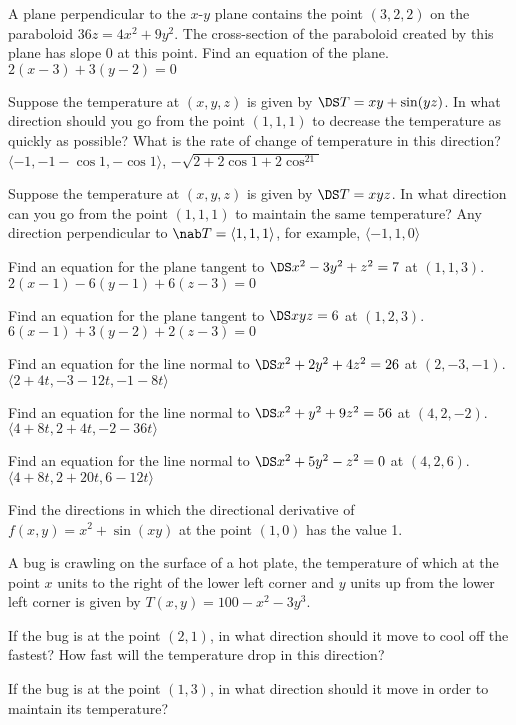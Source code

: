 \begin{multicols}{2}
\problem A plane perpendicular to the $x$-$y$ plane contains the point %
$(3,2,2)$ on the paraboloid $36z=4x^2+9y^2$. The cross-section of the
paraboloid created by this plane has slope 0 at this point.  Find an
equation of the plane.  \answer $2(x-3)+3(y-2)=0$
\endanswer

\problem Suppose the temperature at $(x,y,z)$ is given by $\DS %
T=xy+\sin(yz)$. In what direction should you go from the point $(1,1,1)$ to
decrease the temperature as quickly as possible? What is the rate of change
of temperature in this direction?  \answer $\langle
-1,-1-\cos1,-\cos1\rangle$, $-\sqrt{2+2\cos1+2\cos^21}$
\endanswer

\problem Suppose the temperature at $(x,y,z)$ is given by $\DS T=xyz$. In %
what direction can you go from the point $(1,1,1)$ to maintain the same
temperature?  \answer Any direction perpendicular to $\nab T=\langle
1,1,1\rangle$, for example, $\langle -1,1,0\rangle$
\endanswer

\problem Find an equation for the plane tangent to $\DS x^2-3y^2+z^2=7$ at %
$(1,1,3)$.  \answer $2(x-1)-6(y-1)+6(z-3)=0$
\endanswer

\problem Find an equation for the plane tangent to $\DS xyz=6$ at %
$(1,2,3)$.  \answer $6(x-1)+3(y-2)+2(z-3)=0$
\endanswer

\problem Find an equation for the line normal to $\DS x^2+2y^2+4z^2=26 $ at %
$(2,-3,-1)$.  \answer $\langle 2+4t,-3-12t,-1-8t\rangle$
\endanswer

\problem Find an equation for the line normal to $\DS x^2+y^2+9z^2=56$ at %
$(4,2,-2)$.  \answer $\langle 4+8t,2+4t,-2-36t\rangle$
\endanswer

\problem Find an equation for the line normal to $\DS x^2+5y^2-z^2=0$ at %
$(4,2,6)$.  \answer $\langle 4+8t,2+20t,6-12t\rangle$
\endanswer

\problem Find the directions in which the directional derivative of %
$f(x,y)=x^2+\sin(xy)$ at the point $(1,0)$ has the value 1.

\problem A bug is crawling on the surface of a hot plate, the temperature %
of which at the point $x$ units to the right of the lower left corner and
$y$ units up from the lower left corner is given by $T(x,y)=100-x^2-3y^3$.


\subprob If the bug is at the point $(2,1)$, in what direction should it
move to cool off the fastest?  How fast will the temperature drop in this
direction?

\subprob If the bug is at the point $(1,3)$, in what direction should it
move in order to maintain its temperature?



\end{multicols}
